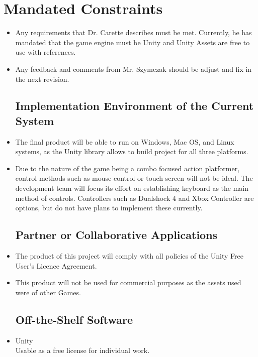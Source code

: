 \documentclass{article}
\begin{document}
	\section{Mandated Constraints}
	\begin{itemize}
	\subsection{Solution Constraints}
	\item Any requirements that Dr. Carette describes must be met. Currently, he has mandated that the game engine must be Unity and Unity Assets are free to use with references.
	\item Any feedback and comments from Mr. Szymczak should be adjust and fix in the next revision.

	\subsection{Implementation Environment of the Current System}
	\item The final product will be able to run on Windows, Mac OS, and Linux systems, as the Unity library allows to build project for all three platforms.
	\item Due to the nature of the game being a combo focused action platformer, control methods such as mouse control or touch screen will not be ideal. The development team will focus its effort on establishing keyboard as the main method of controls. Controllers such as Dualshock 4 and Xbox Controller are options, but do not have plans to implement these currently.

	\subsection{Partner or Collaborative Applications}
	\item The product of this project will comply with all policies of the Unity Free User's Licence Agreement.
	\item This product will not be used for commercial purposes as the assets used were of other Games.

	\subsection{Off-the-Shelf Software}
	\item Unity\\
	Usable as a free license for individual work.


\end{itemize}
\end{document}
